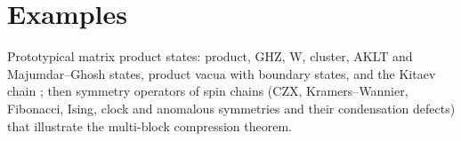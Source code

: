 \part{Examples}
\label{part:examples}

Prototypical matrix product states: product, GHZ, W, cluster, AKLT and
Majumdar--Ghosh states, product vacua with boundary states, and the Kitaev
chain \cite[Appendix]{Cirac2021Matrix}; then symmetry operators of
spin chains (CZX, Kramers--Wannier, Fibonacci, Ising, clock and anomalous
symmetries and their condensation defects) that illustrate the multi-block
compression theorem.
